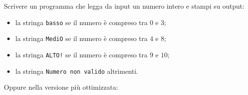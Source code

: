 \begin{Exercise}[label={ex:basso_medio_alto}]
		Scrivere un programma che legga da input un numero intero e stampi su output:
		\begin{itemize}
		  \item la stringa \verb+basso+ se il numero \`e compreso tra $0$ e $3$;
		  \item la stringa \verb+MediO+ se il numero \`e compreso tra $4$ e $8$;
		  \item la stringa \verb+ALTO!+ se il numero \`e compreso tra $9$ e $10$;
		  \item la stringa \verb+Numero non valido+ altrimenti.
		\end{itemize}
		
\end{Exercise}

\begin{Answer}[ref={ex:basso_medio_alto}]
    
    Oppure nella versione pi\`u ottimizzata:
    
\end{Answer}
